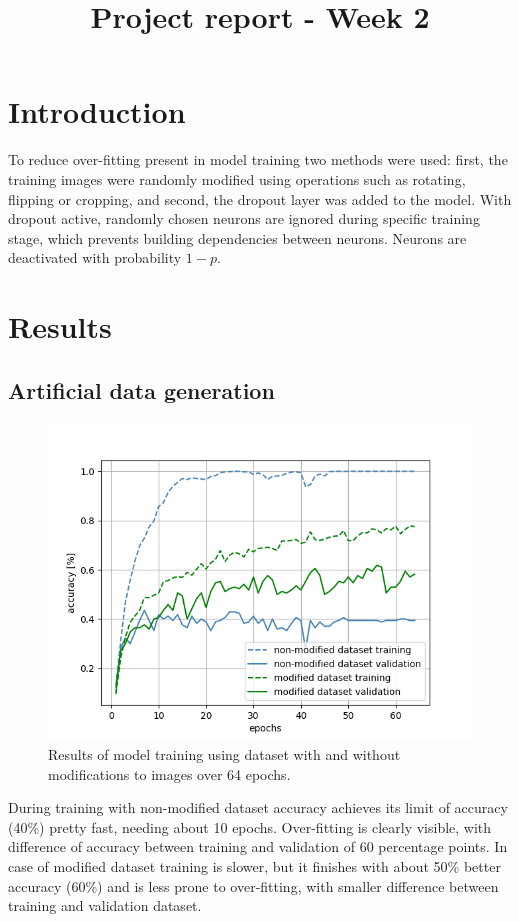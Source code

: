 

\title{Project report - Week 2}


	\maketitle
	\section{Introduction}
		To reduce over-fitting present in model training two methods were used: first, the training images were randomly modified using operations such as rotating, flipping or cropping, and second, the dropout layer was added to the model.
		With dropout active, randomly chosen neurons are ignored during specific training stage, which prevents building dependencies between neurons.
		Neurons are deactivated with probability $1 -p$.	
	\section{Results}
		\subsection{Artificial data generation}
			\begin{figure}[h!]
				\centering
				\includegraphics[width = \textwidth]{img/modified}
				\caption{Results of model training using dataset with and without modifications to images over 64 epochs.}		
			\end{figure}
			During training with non-modified dataset accuracy achieves its limit of accuracy (40\%) pretty fast, needing about 10 epochs. Over-fitting is clearly visible, with difference of accuracy between training and validation of 60 percentage points.
			In case of modified dataset training is slower, but it finishes with about 50\% better accuracy (60\%) and is less prone to over-fitting, with smaller difference between training and validation dataset.		

